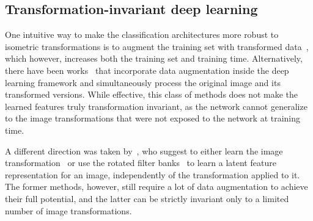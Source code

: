 \documentclass[10pt,journal,compsoc]{IEEEtran}
\newcommand{\renata}[1]{\textcolor{black}{#1}}
\begin{document}
	\subsection{Transformation-invariant deep learning}

	One intuitive way to make the classification architectures more robust to isometric transformations is to augment the training set with transformed data~\cite{bb:van2012art}, which however, increases both the training set and training time. Alternatively, there have been works~\cite{bb:fasel2006rotation, bb:Coors2018VISAPP, bb:dima} that incorporate data augmentation inside the deep learning framework and simultaneously process the original image and its transformed versions. While effective, this class of methods does not make the learned features truly transformation invariant, as the network cannot generalize to the image transformations that were not exposed to the network at training time.

	A different direction was taken by~\cite{bb:STN, bb:dai2018, bb:marcos2016learning}, who suggest to either learn the image transformation~\cite{bb:STN, bb:dai2018} or use the rotated filter banks~\cite{bb:marcos2016learning} to learn a latent feature representation for an image, independently of the transformation applied to it. The former methods, however, still require a lot of data augmentation to achieve their full potential, and the latter can be strictly invariant only to a limited number of image transformations.

\end{document}
